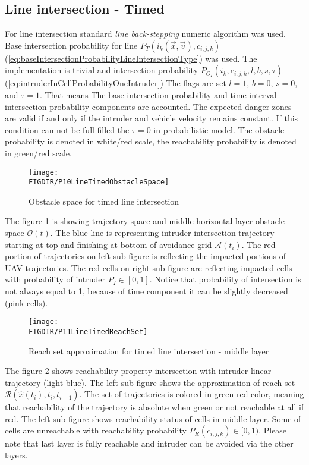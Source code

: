 \subsection{Line intersection - Timed}
\noindent For line intersection standard \emph{line back-stepping} numeric algorithm was used. Base intersection probability for line $P_T(i_k(\vec{x},\vec{v}),c_{i,j,k})$  (\ref{eq:baseIntersectionProbabilityLineIntersectionType}) was used. The implementation is trivial and intersection probability $P_{O_I}(i_k,c_{i,j,k},l,b,s,\tau)$ (\ref{eq:intruderInCellProbabilityOneIntruder}) The flags are set $l=1$, $b=0$, $s=0$, and $\tau=1$. That means The base intersection probability and time interval intersection probability components are accounted. The expected danger zones are valid if and only if the intruder and vehicle velocity remains constant. If this condition can not be full-filled the $\tau=0$ in probabilistic model. The obstacle probability is denoted in white/red scale, the reachability probability is denoted in green/red scale.

\begin{figure}[H]
    \centering
    \texttt{[image: \\FIGDIR/P10LineTimedObstacleSpace]}
    \caption{Obstacle space for timed line intersection}
    \label{fig:P10LineTimedObstacleSpace}
\end{figure}

\noindent The figure \ref{fig:P10LineTimedObstacleSpace} is showing trajectory space and middle horizontal layer obstacle space $\mathscr{O}(t)$. The blue line is representing intruder intersection trajectory starting at top and finishing at bottom of avoidance grid $\mathscr{A}(t_i)$. The red portion of trajectories on left sub-figure is reflecting the impacted portions of UAV trajectories. The red cells on right sub-figure are reflecting impacted cells with probability of intruder $P_I\in [0,1]$. Notice that probability of intersection is not always equal to 1, because of time component it can be slightly decreased (pink cells).

\begin{figure}[H]
    \centering
    \texttt{[image: \\FIGDIR/P11LineTimedReachSet]}
    \caption{Reach set approximation for timed line intersection - middle layer}
    \label{fig:P11LineTimedReachSet}
\end{figure}


\noindent The figure \ref{fig:P11LineTimedReachSet} shows reachability property intersection with intruder linear trajectory (light blue). The left sub-figure shows the approximation of reach set $\mathscr{R}(\hat{x}(t_i),t_i,t_{i+1})$. The set of trajectories is colored in green-red color, meaning that reachability of the trajectory is absolute when green or not reachable at all if red. The left sub-figure shows reachability status of cells in middle layer. Some of cells are unreachable with reachability probability $P_R(c_{i,j,k})\in [0,1)$. Please note that last layer is fully reachable and intruder can be avoided via the other layers.

